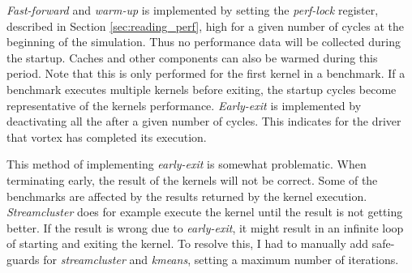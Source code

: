 \textit{Fast-forward} and \textit{warm-up} is implemented by setting the \textit{perf-lock} register, described in Section \ref{sec:reading_perf}, high for a given number of cycles at the beginning of the simulation. Thus no performance data will be collected during the startup. Caches and other components can also be warmed during this period. Note that this is only performed for the first kernel in a benchmark. If a benchmark executes multiple kernels before exiting, the startup cycles become representative of the kernels performance. \textit{Early-exit} is implemented by deactivating all the  after a given number of cycles. This indicates for the driver that \Gls{vortex} has completed its execution. 

This method of implementing \textit{early-exit} is somewhat problematic. When terminating early, the result of the kernels will not be correct. Some of the benchmarks are affected by the results returned by the kernel execution. \textit{Streamcluster} does for example execute the kernel until the result is not getting better. If the result is wrong due to \textit{early-exit}, it might result in an infinite loop of starting and exiting the kernel. To resolve this, I had to manually add safe-guards for \textit{streamcluster} and \textit{kmeans}, setting a maximum number of iterations.





